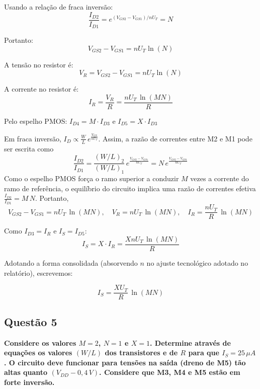 ﻿\documentclass[12pt,a4paper]{article}
\begin{document}
Usando a relação de fraca inversão:
\begin{equation*}
\frac{I_{D2}}{I_{D1}} = e^{(V_{GS2} - V_{GS1})/nU_T} = N
\end{equation*}

Portanto:
\begin{equation*}
V_{GS2} - V_{GS1} = nU_T \ln(N)
\end{equation*}

A tensão no resistor é:
\begin{equation*}
V_R = V_{GS2} - V_{GS1} = nU_T \ln(N)
\end{equation*}

A corrente no resistor é:
\begin{equation*}
I_R = \frac{V_R}{R} = \frac{nU_T \,\ln(MN)}{R}
\end{equation*}

Pelo espelho PMOS: $I_{D4} = M \cdot I_{D3}$ e $I_{D5} = X \cdot I_{D3}$

Em fraca inversão, $I_D \propto \tfrac{W}{L}\,e^{\tfrac{V_{GS}}{nU_T}}$. Assim, a razão de correntes entre M2 e M1 pode ser escrita como
\begin{equation}
\frac{I_{D2}}{I_{D1}} = \frac{(W/L)_2}{(W/L)_1}\,e^{\tfrac{V_{GS2}-V_{GS1}}{nU_T}} = N\,e^{\tfrac{V_{GS2}-V_{GS1}}{nU_T}}
\end{equation}
Como o espelho PMOS força o ramo superior a conduzir $M$ vezes a corrente do ramo de referência, o equilíbrio do circuito implica uma razão de correntes efetiva $\tfrac{I_{D2}}{I_{D1}}=M\,N$. Portanto,
\begin{equation}
V_{GS2}-V_{GS1} = nU_T\,\ln(MN), \quad V_R = nU_T\,\ln(MN), \quad I_R = \frac{nU_T}{R}\,\ln(MN)
\end{equation}

Como $I_{D3} = I_R$ e $I_S = I_{D5}$:
\begin{equation}
I_S = X \cdot I_R = \frac{XnU_T \,\ln(MN)}{R}
\end{equation}

Adotando a forma consolidada (absorvendo $n$ no ajuste tecnológico adotado no relatório), escrevemos:

\begin{equation}
\boxed{I_S = \frac{XU_T}{R} \,\ln(MN)}
\end{equation}

\subsection*{Questão 5}
    	\textbf{Considere os valores $M = 2$, $N = 1$ e $X = 1$. Determine através de equações os valores $(W/L)$ dos transistores e de $R$ para que $I_S = 25\,\mu A$. O circuito deve funcionar para tensões na saída (dreno de M5) tão altas quanto $(V_{DD} - 0{,}4\,V)$. Considere que M3, M4 e M5 estão em forte inversão.}\\
\end{document}
